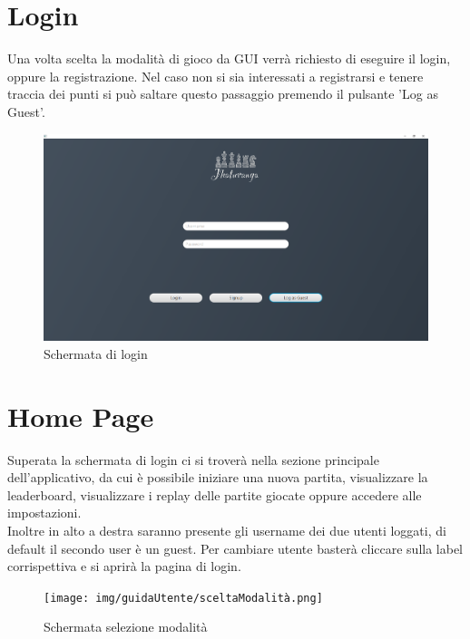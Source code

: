 \documentclass[a4paper,12pt]{report}
\begin{document}
\section{Login}
Una volta scelta la modalità di gioco da GUI verrà richiesto di eseguire il login, oppure la registrazione. Nel caso non si sia interessati a registrarsi e tenere traccia dei punti si può saltare questo passaggio premendo il pulsante 'Log as Guest'.
\begin{figure}[H]
    \begin{center}
        \centering
        \includegraphics[scale=0.25]{img/guidaUtente/login.png}
    \end{center}
    \caption{Schermata di login}
    \label{img:login}
\end{figure}

%
\section{Home Page}
Superata la schermata di login ci si troverà nella sezione principale dell'applicativo, da cui è possibile iniziare una nuova partita, visualizzare la leaderboard, visualizzare i replay delle partite giocate oppure accedere alle impostazioni.
\\
Inoltre in alto a destra saranno presente gli username dei due utenti loggati, di default il secondo user è un guest.
Per cambiare utente basterà cliccare sulla label corrispettiva e si aprirà la pagina di login.
\begin{figure}[H]
    \begin{center}
        \centering
        \texttt{[image: img/guidaUtente/sceltaModalità.png]}
    \end{center}
    \caption{Schermata selezione modalità}
    \label{img:sceltaModalità}
\end{figure}
\end{document}
